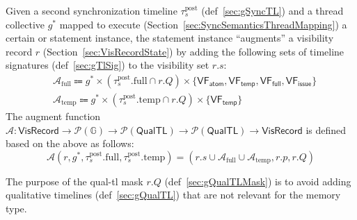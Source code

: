 

Given a second synchronization timeline $\tau_s^\mathrm{post}$ (def~\ref{sec:gSyncTL}) and a thread collective $g^*$ mapped to execute (Section~\ref{sec:SyncSemanticsThreadMapping}) a certain  or  statement instance, the statement instance ``augments'' a visibility record $r$ (Section~\ref{sec:VisRecordState}) by adding the following sets of timeline signatures (def~\ref{sec:gTlSig}) to the visibility set $r.s$:
\begin{align*}
    & \mathcal{A}_\mathrm{full} \Coloneqq g^* \times (\tau_s^\mathrm{post}.\mathrm{full} \cap r.Q) \times \{ \mathsf{VF_{atom}}, \mathsf{VF_{temp}}, \mathsf{VF_{full}}, \mathsf{VF_{issue}} \} \\
    & \mathcal{A}_\mathrm{temp} \Coloneqq g^* \times (\tau_s^\mathrm{post}.\mathrm{temp} \cap r.Q) \times \{ \mathsf{VF_{temp}} \}
\end{align*}
The augment function $\mathcal{A}: \mathsf{VisRecord} \to \mathcal{P}(\mathbb{G}) \to \mathcal{P}(\mathsf{QualTL}) \to \mathcal{P}(\mathsf{QualTL}) \to \mathsf{VisRecord}$ is defined based on the above as follows:
\begin{equation*}
    \mathcal{A}(r, g^*, \tau_s^\mathrm{post}.\mathrm{full}, \tau_s^\mathrm{post}.\mathrm{temp}) = (r.s\cup \mathcal{A}_\mathrm{full} \cup \mathcal{A}_\mathrm{temp}, r.p, r.Q)
\end{equation*}

The purpose of the qual-tl mask $r.Q$ (def~\ref{sec:gQualTLMask}) is to avoid adding qualitative timelines (def~\ref{sec:gQualTL}) that are not relevant for the memory type.
